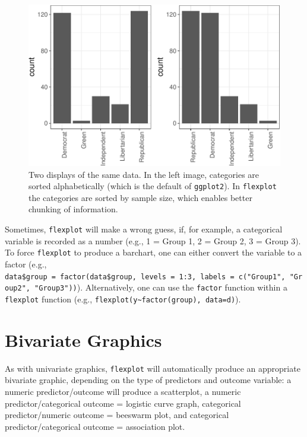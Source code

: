 \documentclass[
  english,
  man]{apa6}
\begin{document}
\small

\begin{figure}
\centering
\includegraphics{flexplot_psychmeth_files/figure-latex/chunkit-1.pdf}
\caption{\label{fig:chunkit}Two displays of the same data. In the left image, categories are sorted alphabetically (which is the default of \texttt{ggplot2}). In \texttt{flexplot} the categories are sorted by sample size, which enables better chunking of information. \label{fig:chunkit}}
\end{figure}

\normalsize

Sometimes, \texttt{flexplot} will make a wrong guess, if, for example, a categorical variable is recorded as a number (e.g., 1 = Group 1, 2 = Group 2, 3 = Group 3). To force \texttt{flexplot} to produce a barchart, one can either convert the variable to a factor (e.g., \texttt{data\$group\ =\ factor(data\$group,\ levels\ =\ 1:3,\ labels\ =\ c("Group1",\ "Group2",\ "Group3"))}). Alternatively, one can use the \texttt{factor} function within a \texttt{flexplot} function (e.g., \texttt{flexplot(y\textasciitilde{}factor(group),\ data=d)}).

\hypertarget{bivariate-graphics}{%
\section{Bivariate Graphics}\label{bivariate-graphics}}

As with univariate graphics, \texttt{flexplot} will automatically produce an appropriate bivariate graphic, depending on the type of predictors and outcome variable: a numeric predictor/outcome will produce a scatterplot, a numeric predictor/categorical outcome = logistic curve graph, categorical predictor/numeric outcome = beeswarm plot, and categorical predictor/categorical outcome = association plot.
\end{document}

